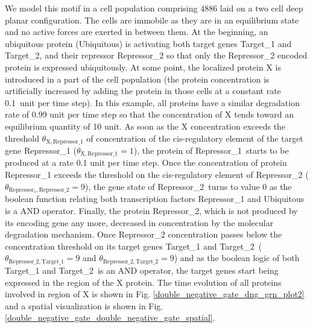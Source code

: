   We model this motif in a cell population comprising 4886 laid on a two cell deep planar configuration. The cells are immobile as they are in an equilibrium state and no active forces are exerted in between them. At the beginning, an ubiquitous protein (Ubiquitous) is activating both target genes Target_1 and Target_2, and their repressor Repressor_2 so that only the Repressor_2 encoded protein is expressed ubiquitously. At some point, the localized protein X is introduced in a part of the cell population (the protein concentration is artificially increased by adding the protein in those cells at a constant rate 0.1 unit per time step). In this example, all proteins have a similar degradation rate of 0.99 unit per time step so that the concentration of X tends toward an equilibrium quantity of 10 unit. As soon as the X concentration exceeds the threshold $\theta_{\mathrm{X},\mathrm{Repressor\_1}}$ of concentration of the cis-regulatory element of the target gene Repressor_1 ($\theta_{\mathrm{X},\mathrm{Repressor\_1}} = 1$), the protein of Repressor_1 starts to be produced at a rate 0.1 unit per time step. Once the concentration of protein Repressor_1 exceeds the threshold on the cis-regulatory element of Repressor_2 ($\theta_{\mathrm{Repressor_1},\mathrm{Repressor\_2}} = 9$), the gene state of Repressor_2 turns to value 0 as the boolean function relating both transcription factors Repressor_1 and Ubiquitous is a AND operator. Finally, the protein Repressor_2, which is not produced by its encoding gene any more, decreased in concentration by the molecular degradation mechanism. Once Repressor_2 concentration passes below the concentration threshold on its target genes Target_1 and Target_2 ($\theta_{\mathrm{Repressor\_2},\mathrm{Target\_1}} = 9$ and $\theta_{\mathrm{Repressor\_2},\mathrm{Target\_2}} = 9$) and as the boolean logic of both Target_1 and Target_2 is an AND operator, the target genes start being expressed in the region of the X protein. The time evolution of all proteins involved in region of X is shown in Fig. \ref{double_negative_gate_dng_grn_plot2} and a spatial visualization is shown in Fig. \ref{double_negative_gate_double_negative_gate_spatial}. 
